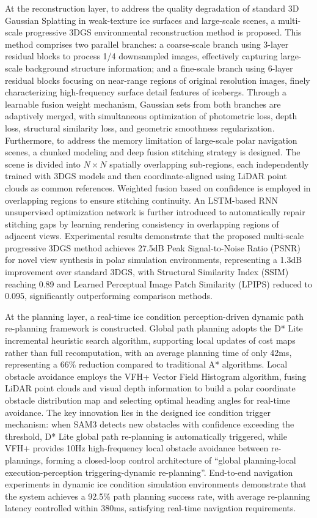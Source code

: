 \documentclass[12pt,a4paper]{ctexbook}
\begin{document}
At the reconstruction layer, to address the quality degradation of standard 3D Gaussian Splatting in weak-texture ice surfaces and large-scale scenes, a multi-scale progressive 3DGS environmental reconstruction method is proposed. This method comprises two parallel branches: a coarse-scale branch using 3-layer residual blocks to process 1/4 downsampled images, effectively capturing large-scale background structure information; and a fine-scale branch using 6-layer residual blocks focusing on near-range regions of original resolution images, finely characterizing high-frequency surface detail features of icebergs. Through a learnable fusion weight mechanism, Gaussian sets from both branches are adaptively merged, with simultaneous optimization of photometric loss, depth loss, structural similarity loss, and geometric smoothness regularization. Furthermore, to address the memory limitation of large-scale polar navigation scenes, a chunked modeling and deep fusion stitching strategy is designed. The scene is divided into $N \times N$ spatially overlapping sub-regions, each independently trained with 3DGS models and then coordinate-aligned using LiDAR point clouds as common references. Weighted fusion based on confidence is employed in overlapping regions to ensure stitching continuity. An LSTM-based RNN unsupervised optimization network is further introduced to automatically repair stitching gaps by learning rendering consistency in overlapping regions of adjacent views. Experimental results demonstrate that the proposed multi-scale progressive 3DGS method achieves 27.5dB Peak Signal-to-Noise Ratio (PSNR) for novel view synthesis in polar simulation environments, representing a 1.3dB improvement over standard 3DGS, with Structural Similarity Index (SSIM) reaching 0.89 and Learned Perceptual Image Patch Similarity (LPIPS) reduced to 0.095, significantly outperforming comparison methods.

At the planning layer, a real-time ice condition perception-driven dynamic path re-planning framework is constructed. Global path planning adopts the D* Lite incremental heuristic search algorithm, supporting local updates of cost maps rather than full recomputation, with an average planning time of only 42ms, representing a 66\% reduction compared to traditional A* algorithms. Local obstacle avoidance employs the VFH+ Vector Field Histogram algorithm, fusing LiDAR point clouds and visual depth information to build a polar coordinate obstacle distribution map and selecting optimal heading angles for real-time avoidance. The key innovation lies in the designed ice condition trigger mechanism: when SAM3 detects new obstacles with confidence exceeding the threshold, D* Lite global path re-planning is automatically triggered, while VFH+ provides 10Hz high-frequency local obstacle avoidance between re-plannings, forming a closed-loop control architecture of ``global planning-local execution-perception triggering-dynamic re-planning''. End-to-end navigation experiments in dynamic ice condition simulation environments demonstrate that the system achieves a 92.5\% path planning success rate, with average re-planning latency controlled within 380ms, satisfying real-time navigation requirements.
\end{document}
